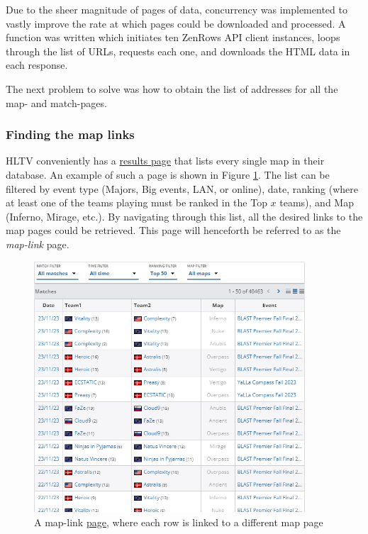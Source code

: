 Due to the sheer magnitude of pages of data, concurrency was implemented to vastly improve the rate at which pages could be downloaded and processed. A function was written which initiates ten ZenRows API client instances, loops through the list of URLs, requests each one, and downloads the HTML data in each response. 

The next problem to solve was how to obtain the list of addresses for all the map- and match-pages.

\subsubsection{Finding the map links}

HLTV conveniently has a \href{https://www.hltv.org/stats/matches}{results page} that lists every single map in their database. An example of such a page is shown in Figure \ref{fig:map_urls}. The list can be filtered by event type (Majors, Big events, LAN, or online), date, ranking (where at least one of the teams playing must be ranked in the Top $x$ teams), and Map (Inferno, Mirage, etc.). By navigating through this list, all the desired links to the map pages could be retrieved. This page will henceforth be referred to as the \textit{map-link} page.

\begin{figure}[h]
	\centering
	\includegraphics[width=0.9\textwidth]{Figures/hltv/map-urls-cropped-2.png}
	\caption{A map-link \href{https://www.hltv.org/stats/matches?startDate=all&rankingFilter=Top50}{page}, where each row is linked to a different map page}
	\label{fig:map_urls}
\end{figure}

